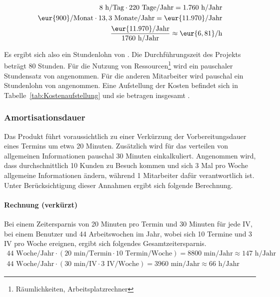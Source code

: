 \begin{eqnarray}
8 \mbox{ h/Tag} \cdot 220 \mbox{ Tage/Jahr} = 1.760 \mbox{ h/Jahr}\\
\eur{900}\mbox{/Monat} \cdot 13,3 \mbox{ Monate/Jahr} = \eur{11.970} \mbox{/Jahr}\\
\frac{\eur{11.970} \mbox{/Jahr}}{1760 \mbox{ h/Jahr}} \approx \eur{6,81}\mbox{/h}
\end{eqnarray}

Es ergibt sich also ein Stundenlohn von .
Die Durchführungszeit des Projekts beträgt 80 Stunden. Für die Nutzung von Ressourcen\footnote{Räumlichkeiten, Arbeitsplatzrechner \etc} wird
ein pauschaler Stundensatz von  angenommen. Für die anderen Mitarbeiter wird pauschal ein Stundenlohn von  angenommen.
Eine Aufstellung der Kosten befindet sich in Tabelle~\ref{tab:Kostenaufstellung} und sie betragen insgesamt .


\subsubsection{Amortisationsdauer}
\label{sec:Amortisationsdauer}
Das Produkt führt voraussichtlich zu einer Verkürzung der Vorbereitungsdauer eines Termins um etwa 20 Minuten.
Zusätzlich wird für das verteilen von allgemeinen Informationen pauschal 30 Minuten einkalkuliert.
Angenommen wird, dass durchschnittlich 10 Kunden zu Besuch kommen und sich 3 Mal pro Woche allgemeine Informationen ändern, während 1 Mitarbeiter dafür verantwortlich ist.
Unter Berücksichtigung dieser Annahmen ergibt sich folgende Berechnung.

\paragraph{Rechnung (verkürzt)}
Bei einem Zeitersparnis von 20 Minuten pro Termin und 30 Minuten für jede \ac{IV}, bei einem Benutzer und 44 Arbeitswochen im Jahr, wobei sich 10 Termine und 3 \ac{IV} pro Woche ereignen, ergibt sich folgendes Gesamtzeitersparnis.
\begin{eqnarray}
44 \mbox{ Woche/Jahr} \cdot (20 \mbox{ min/Termin} \cdot 10 \mbox{ Termin/Woche}) = 8800 \mbox{ min/Jahr} \approx 147 \mbox{ h/Jahr}\\
44 \mbox{ Woche/Jahr} \cdot (30 \mbox{ min/IV} \cdot 3 \mbox{ IV/Woche}) = 3960 \mbox{ min/Jahr} \approx 66 \mbox{ h/Jahr}
\end{eqnarray}

